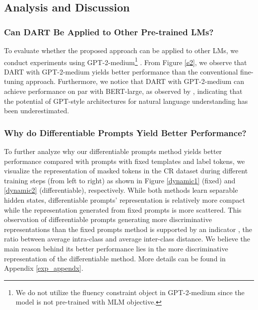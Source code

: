 \documentclass{article} \usepackage{iclr2022_conference,times}
\begin{document}
\subsection{Analysis and Discussion}





\subsubsection*{Can DART Be Applied to Other Pre-trained LMs?}

To evaluate whether the proposed approach can be applied to other LMs, we conduct experiments using GPT-2-medium\footnote{
{\color{highlight}
We do not utilize the fluency constraint object in GPT-2-medium since the model is not pre-trained with MLM objective.}
}
.
From Figure \ref{e2}, we observe that DART with GPT-2-medium yields better performance than the conventional fine-tuning approach.
Furthermore, we notice that DART with GPT-2-medium can achieve performance on par with BERT-large, as observed by \cite{DBLP:journals/corr/abs-2103-10385}, indicating that the potential of GPT-style architectures for natural language understanding has been underestimated.



\subsubsection*{Why do Differentiable Prompts Yield Better Performance?}

To further analyze why our differentiable prompts method yields better performance compared with prompts with fixed templates and label tokens, we visualize the representation of masked tokens in the CR dataset during different training steps (from left to right) as shown in Figure \ref{dynamic1} (fixed) and \ref{dynamic2} (differentiable), respectively.
While both methods learn separable hidden states, differentiable prompts' representation is relatively more compact while the representation generated from fixed prompts is more scattered.
This observation of differentiable prompts generating more discriminative representations than the fixed prompts method is supported by an indicator , the ratio between average intra-class and average inter-class distance. We believe the main reason behind its better performance lies in the more discriminative representation of the differentiable method. More details can be found in Appendix \ref{exp_appendx}.
\end{document}
